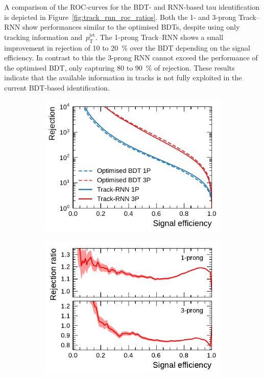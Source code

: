 A comparison of the ROC-curves for the BDT- and RNN-based tau identification is
depicted in Figure~\ref{fig:track_rnn_roc_ratios}. Both the 1- and 3-prong
Track--RNN show performances similar to the optimised BDTs, despite using only
tracking information and~$p_\text{T}^\text{jet}$. The 1-prong Track--RNN shows a
small improvement in rejection of \num{10} to \SI{20}{\percent} over the BDT
depending on the signal efficiency. In contrast to this the 3-prong RNN cannot
exceed the performance of the optimised BDT, only capturing \num{80} to
\SI{90}{\percent} of rejection. These results indicate that the available
information in tracks is not fully exploited in the current BDT-based
identification.

\begin{figure}[htb]
  \begin{subfigure}[t]{0.48\textwidth}
    \centering
    \includegraphics{./figures/rnn/track/roc_fixed.pdf}
  \end{subfigure}\hfill
  \begin{subfigure}[t]{0.48\textwidth}
    \centering
    \includegraphics{./figures/rnn/track/ratios.pdf}

\end{subfigure}
\end{figure}
